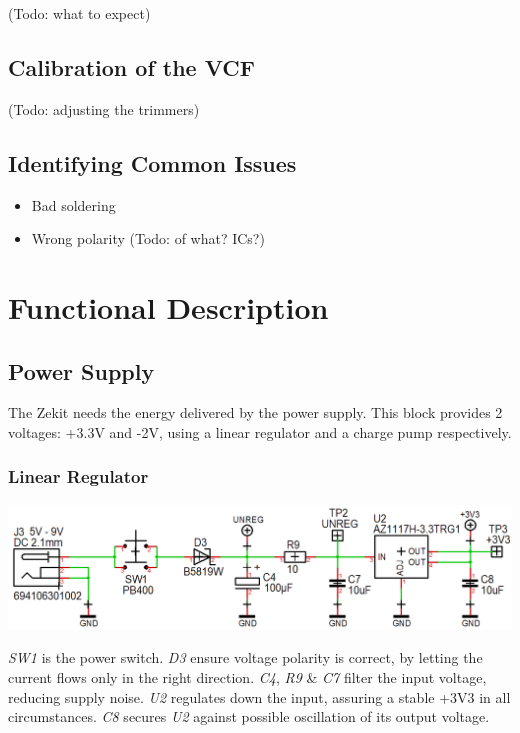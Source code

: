 \documentclass{scrartcl}
\begin{document}
 (Todo: what to expect)

\subsection{Calibration of the VCF}

(Todo: adjusting the trimmers)

\subsection{Identifying Common Issues}

\begin{itemize}
    \item Bad soldering
    \item Wrong polarity (Todo: of what? ICs?)
\end{itemize}

\pagebreak


\section{Functional Description}

\subsection{Power Supply}

The Zekit needs the energy delivered by the power supply. This block provides 2 voltages: +3.3V and -2V, using a linear regulator and a charge pump respectively.

\subsubsection{Linear Regulator}

\begin{center}
    \includegraphics[scale=0.4]{assets/schema-power.png}
\end{center}

\emph{SW1} is the power switch. \emph{D3} ensure voltage polarity is correct, by letting the current flows only in the right direction. \emph{C4}, \emph{R9} \& \emph{C7} filter the input voltage, reducing supply noise. \emph{U2} regulates down the input, assuring a stable +3V3 in all circumstances. \emph{C8} secures \emph{U2} against possible oscillation of its output voltage.
\end{document}
